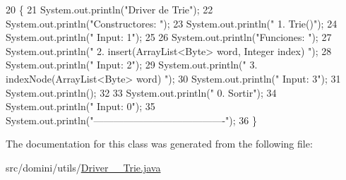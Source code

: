 \begin{DoxyCode}
20                                      \{
21         System.out.println(\textcolor{stringliteral}{"Driver de Trie"});
22         System.out.println(\textcolor{stringliteral}{"Constructores: "});
23         System.out.println(\textcolor{stringliteral}{"     1. Trie()"});
24         System.out.println(\textcolor{stringliteral}{"     Input: 1"});
25 
26         System.out.println(\textcolor{stringliteral}{"Funciones: "});
27         System.out.println(\textcolor{stringliteral}{"     2. insert(ArrayList<Byte> word, Integer index) "});
28         System.out.println(\textcolor{stringliteral}{"     Input: 2"});
29         System.out.println(\textcolor{stringliteral}{"     3. indexNode(ArrayList<Byte> word) "});
30         System.out.println(\textcolor{stringliteral}{"     Input: 3"});
31         System.out.println();
32 
33         System.out.println(\textcolor{stringliteral}{"     0. Sortir"});
34         System.out.println(\textcolor{stringliteral}{"     Input: 0"});
35         System.out.println(\textcolor{stringliteral}{"----------------------------------------"});
36     \}
\end{DoxyCode}


The documentation for this class was generated from the following file\+:\begin{DoxyCompactItemize}
\item 
src/domini/utils/\hyperlink{Driver____Trie_8java}{Driver\+\_\+\+\_\+\+Trie.\+java}\end{DoxyCompactItemize}
